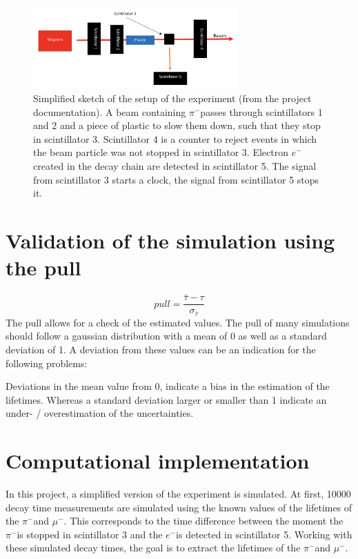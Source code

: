 \documentclass[11pt, a4paper, oneside]{book}
\newcommand{\electron}{$e^{-}$}
\newcommand{\pion}{$\pi^{-}$}
\newcommand{\muon}{$\mu^{-}$}
\begin{document}
\begin{figure}[h]
\begin{center}
\includegraphics[width=0.7\textwidth]{images/experimental_setup.png}
\end{center}
\caption{Simplified sketch of the setup of the experiment (from the project documentation). A beam containing \pion passes through scintillators 1 and 2 and a piece of plastic to slow them down, such that they stop in scintillator 3. Scintillator 4 is a counter to reject events in which the beam particle was not stopped in scintillator 3. Electron \electron created in the decay chain are detected in scintillator 5. The signal from scintillator 3 starts a clock, the signal from scintillator 5 stops it.}
\label{fig:experimental_setup}
\end{figure}

\section{Validation of the simulation using the pull}
\begin{equation}
    \si{pull} = \frac{\bar{\tau} - \tau}{\sigma_{\bar{\tau}}}
    \label{eq:pull}
\end{equation}
The pull allows for a check of the estimated values. The pull of many simulations should follow a gaussian distribution with a mean of 0 as well as a standard deviation of 1. A deviation from these values can be an indication for the following problems:

Deviations in the mean value from 0, indicate a bias in the estimation of the lifetimes. Whereas a standard deviation larger or smaller than 1 indicate an under- / overestimation of the uncertainties. 

\section{Computational implementation}
In this project, a simplified version of the experiment is simulated. At first, \num{10000} decay time measurements are simulated using the known values of the lifetimes of the \pion and \muon. This corresponds to the time difference between the moment the \pion is stopped in scintillator 3 and the \electron is detected in scintillator 5. Working with these simulated decay times, the goal is to extract the lifetimes of the \pion and \muon.
\end{document}
